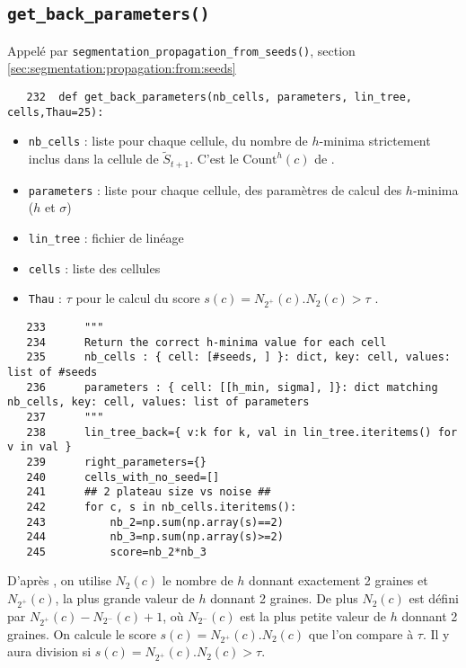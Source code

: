 \documentclass{article}
\def \mycolor {red}
\begin{document}
\subsection{\texttt{get\_back\_parameters()}}
\label{sec:get:back:parameters}
\color{\mycolor}
Appel\'e par \texttt{segmentation\_propagation\_from\_seeds()},
section \ref{sec:segmentation:propagation:from:seeds}
\color{black}
\begin{verbatim}
   232	def get_back_parameters(nb_cells, parameters, lin_tree, cells,Thau=25):
\end{verbatim} 
\color{\mycolor}
\begin{itemize}
\itemsep -0.5ex
\item \verb|nb_cells| : liste pour chaque cellule, du nombre de $h$-minima strictement inclus dans la cellule de  $\tilde{S}_{t+1}$. C'est le $\mathrm{Count}^{h}(c)$ de \cite[section 2.3.3.5, page 71]{guignard:tel-01278725}.
\item \verb|parameters| : liste pour chaque cellule,  des param\`etres de calcul des $h$-minima ($h$ et $\sigma$)
\item \verb|lin_tree| : fichier de lin\'eage
\item \verb|cells| : liste des cellules
\item \verb|Thau| : $\tau$ pour le calcul du score $s(c) = N_{2^{+}}(c) . N_2(c) > \tau$ \cite[page 72]{guignard:tel-01278725}.
\end{itemize}
\color{black}
\begin{verbatim}
   233	    """
   234	    Return the correct h-minima value for each cell
   235	    nb_cells : { cell: [#seeds, ] }: dict, key: cell, values: list of #seeds
   236	    parameters : { cell: [[h_min, sigma], ]}: dict matching nb_cells, key: cell, values: list of parameters
   237	    """
   238	    lin_tree_back={ v:k for k, val in lin_tree.iteritems() for v in val }
   239	    right_parameters={}
   240	    cells_with_no_seed=[]
   241	    ## 2 plateau size vs noise ##
   242	    for c, s in nb_cells.iteritems():
   243	        nb_2=np.sum(np.array(s)==2)
   244	        nb_3=np.sum(np.array(s)>=2)
   245	        score=nb_2*nb_3
\end{verbatim} 
\color{\mycolor}
D'apr\`es \cite[page 72]{guignard:tel-01278725}, on utilise $N_2(c)$ le nombre de $h$ donnant exactement 2 graines et $N_{2^{+}}(c)$, la plus grande valeur de $h$ donnant 2 graines. De plus $N_2(c)$ est d\'efini par $N_{2^{+}}(c) - N_{2^{-}}(c) +1$, o\`u $N_{2^{-}}(c)$ est la plus petite valeur de $h$ donnant 2 graines. 
On calcule le score $s(c) = N_{2^{+}}(c) . N_2(c)$ que l'on compare \`a $\tau$. Il y aura division si $s(c) = N_{2^{+}}(c) . N_2(c) > \tau$.
\end{document}
